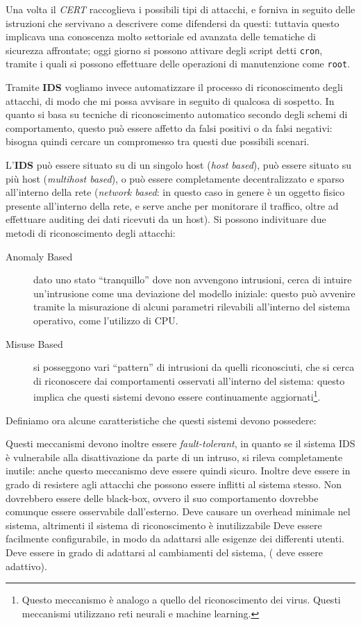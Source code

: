 Una volta il \textit{CERT} raccoglieva i possibili tipi di attacchi, 
e forniva in seguito delle istruzioni che servivano a descrivere come difendersi
da questi: tuttavia questo implicava una conoscenza molto settoriale ed avanzata
delle tematiche di sicurezza affrontate; oggi giorno 
si possono attivare degli  script detti \texttt{cron}, tramite i quali si possono 
effettuare delle operazioni di manutenzione come \texttt{root}. 

Tramite \textbf{IDS} vogliamo invece automatizzare il processo di riconoscimento
degli attacchi, di modo che mi possa avvisare in seguito di qualcosa di sospetto.
In quanto si basa su tecniche di riconoscimento automatico secondo degli schemi
di comportamento, questo può essere affetto da falsi positivi o da falsi negativi:
bisogna quindi cercare un compromesso tra questi due possibili scenari.

L'\textbf{IDS} può essere situato su di un singolo host (\textit{host based}), può essere
situato su più host (\textit{multihost based}), o può essere completamente decentralizzato
e sparso all'interno della rete (\textit{network based}: in questo caso in genere è 
un oggetto fisico presente all'interno della rete, e serve anche per monitorare 
il traffico, oltre ad effettuare auditing dei dati ricevuti da un host). 
Si possono indivituare due metodi di riconoscimento degli attacchi:
\begin{description}
\item[Anomaly Based] dato uno stato ``tranquillo'' dove non avvengono intrusioni,
	cerca di intuire un'intrusione come una deviazione del modello iniziale:
	questo può avvenire tramite la misurazione di alcuni parametri rilevabili
	all'interno del sistema operativo, come l'utilizzo di CPU.
\item[Misuse Based] si posseggono vari ``pattern'' di intrusioni da quelli riconosciuti,
	che si cerca di riconoscere dai comportamenti osservati all'interno del
	sistema: questo implica che questi sistemi devono essere continuamente
	aggiornati\footnote{Questo meccanismo è analogo a quello del riconoscimento 
	dei virus. Questi meccanismi utilizzano reti neurali e machine learning.}.
\end{description}
Definiamo ora alcune caratteristiche che questi sistemi devono possedere:
\begin{itemize}
\diam Questi meccanismi devono inoltre essere \textit{fault-tolerant}, in quanto se il
sistema IDS è vulnerabile alla disattivazione da parte di un intruso, si rileva
completamente inutile: anche questo meccanismo deve essere quindi sicuro. Inoltre
deve essere in grado di resistere agli attacchi che possono essere inflitti al
sistema stesso.
\diam Non dovrebbero essere delle black-box, ovvero il suo comportamento dovrebbe
	comunque essere osservabile dall'esterno.
\diam Deve causare un overhead minimale nel sistema, altrimenti il sistema di
	riconoscimento è inutilizzabile
\diam Deve essere facilmente configurabile, in modo da adattarsi alle esigenze
	dei differenti utenti.
\diam Deve essere in grado di adattarsi al cambiamenti del sistema, (
	deve essere adattivo).
\end{itemize}

